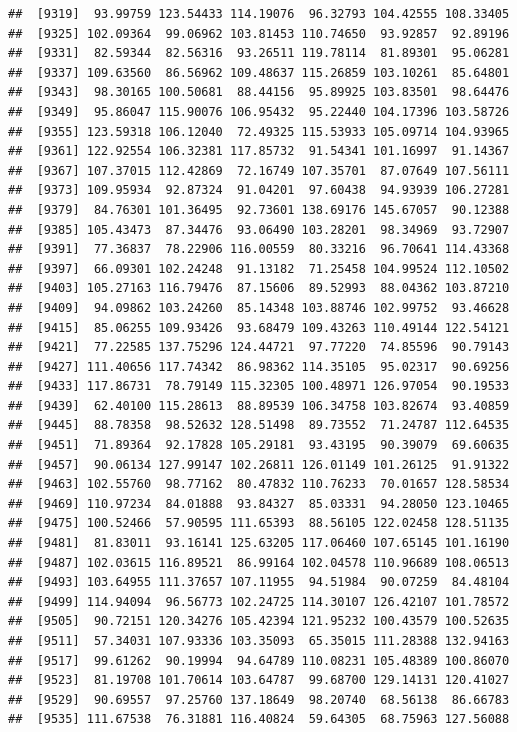 \documentclass[
]{article}
\begin{document}
\begin{verbatim}
##  [9319]  93.99759 123.54433 114.19076  96.32793 104.42555 108.33405
##  [9325] 102.09364  99.06962 103.81453 110.74650  93.92857  92.89196
##  [9331]  82.59344  82.56316  93.26511 119.78114  81.89301  95.06281
##  [9337] 109.63560  86.56962 109.48637 115.26859 103.10261  85.64801
##  [9343]  98.30165 100.50681  88.44156  95.89925 103.83501  98.64476
##  [9349]  95.86047 115.90076 106.95432  95.22440 104.17396 103.58726
##  [9355] 123.59318 106.12040  72.49325 115.53933 105.09714 104.93965
##  [9361] 122.92554 106.32381 117.85732  91.54341 101.16997  91.14367
##  [9367] 107.37015 112.42869  72.16749 107.35701  87.07649 107.56111
##  [9373] 109.95934  92.87324  91.04201  97.60438  94.93939 106.27281
##  [9379]  84.76301 101.36495  92.73601 138.69176 145.67057  90.12388
##  [9385] 105.43473  87.34476  93.06490 103.28201  98.34969  93.72907
##  [9391]  77.36837  78.22906 116.00559  80.33216  96.70641 114.43368
##  [9397]  66.09301 102.24248  91.13182  71.25458 104.99524 112.10502
##  [9403] 105.27163 116.79476  87.15606  89.52993  88.04362 103.87210
##  [9409]  94.09862 103.24260  85.14348 103.88746 102.99752  93.46628
##  [9415]  85.06255 109.93426  93.68479 109.43263 110.49144 122.54121
##  [9421]  77.22585 137.75296 124.44721  97.77220  74.85596  90.79143
##  [9427] 111.40656 117.74342  86.98362 114.35105  95.02317  90.69256
##  [9433] 117.86731  78.79149 115.32305 100.48971 126.97054  90.19533
##  [9439]  62.40100 115.28613  88.89539 106.34758 103.82674  93.40859
##  [9445]  88.78358  98.52632 128.51498  89.73552  71.24787 112.64535
##  [9451]  71.89364  92.17828 105.29181  93.43195  90.39079  69.60635
##  [9457]  90.06134 127.99147 102.26811 126.01149 101.26125  91.91322
##  [9463] 102.55760  98.77162  80.47832 110.76233  70.01657 128.58534
##  [9469] 110.97234  84.01888  93.84327  85.03331  94.28050 123.10465
##  [9475] 100.52466  57.90595 111.65393  88.56105 122.02458 128.51135
##  [9481]  81.83011  93.16141 125.63205 117.06460 107.65145 101.16190
##  [9487] 102.03615 116.89521  86.99164 102.04578 110.96689 108.06513
##  [9493] 103.64955 111.37657 107.11955  94.51984  90.07259  84.48104
##  [9499] 114.94094  96.56773 102.24725 114.30107 126.42107 101.78572
##  [9505]  90.72151 120.34276 105.42394 121.95232 100.43579 100.52635
##  [9511]  57.34031 107.93336 103.35093  65.35015 111.28388 132.94163
##  [9517]  99.61262  90.19994  94.64789 110.08231 105.48389 100.86070
##  [9523]  81.19708 101.70614 103.64787  99.68700 129.14131 120.41027
##  [9529]  90.69557  97.25760 137.18649  98.20740  68.56138  86.66783
##  [9535] 111.67538  76.31881 116.40824  59.64305  68.75963 127.56088

\end{verbatim}
\end{document}
